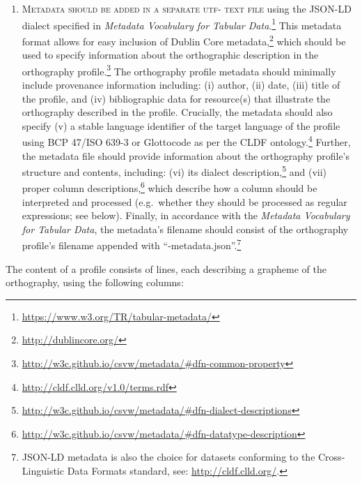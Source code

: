 \begin{enumerate}
	\item \textsc{Metadata should be added in a separate utf-\scalebox{0.8}{8} text file} using 
	   the JSON-LD dialect specified in \textit{Metadata Vocabulary for Tabular 
	   Data}.\footnote{\url{https://www.w3.org/TR/tabular-metadata/}} This metadata 
	   format allows for easy inclusion of Dublin Core metadata,\footnote{\url{http://dublincore.org/}} 
	   which should be used to specify information about the orthographic description 
	   in the orthography profile.\footnote{\url{http://w3c.github.io/csvw/metadata/#dfn-common-property}} 
	   The orthography profile metadata should minimally include provenance information including: 
	   (i) author, (ii) date, (iii) title of the profile, and (iv)
       bibliographic data for resource(s) that illustrate the orthography
       described in the profile. Crucially, the metadata should also specify 
	   (v) a stable language identifier of the target language of the profile
       using BCP 47/ISO 639-3 or Glottocode as per the CLDF ontology.\footnote{\url{http://cldf.clld.org/v1.0/terms.rdf}}	   	   
	   Further, the metadata file should provide information about the orthography profile's structure and contents, 
	   including: (vi) its dialect description,\footnote{\url{http://w3c.github.io/csvw/metadata/#dfn-dialect-descriptions}} 
	   and (vii) proper column descriptions,\footnote{\url{http://w3c.github.io/csvw/metadata/#dfn-datatype-description}} 
	   which describe how a column should be interpreted and processed (e.g.\ whether they 
	   should be processed as regular expressions; see below).
	   Finally, in accordance with the \textit{Metadata Vocabulary for Tabular 
	   Data}, the metadata's filename should consist of the orthography 
	   profile's filename appended with ``-metadata.json''.\footnote{JSON-LD metadata 
	   is also the choice for datasets conforming to the Cross-Linguistic Data Formats standard, 
	   see: \url{http://cldf.clld.org/}.}

\end{enumerate}

\noindent The content of a profile consists of lines, each describing a grapheme
of the orthography, using the following columns:

